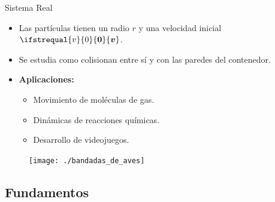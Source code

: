 \documentclass{beamer}
\renewcommand\vec[1]{\ifstrequal{#1}{0}{\ensuremath{\mathbf{0}}}{\ensuremath{\boldsymbol{#1}}}}
\begin{document}
            \begin{frame}{Sistema Real}
                \begin{itemize}
                    \item Las partículas tienen un radio $r$ y una velocidad inicial $\vec{v}$.
                    \item Se estudia como colisionan entre sí y con las paredes del contenedor.
                \end{itemize}
                \begin{minipage}[t]{0.5\textwidth}
                    \begin{itemize}
                        \item \textbf{Aplicaciones:}
                        \begin{itemize}
                            \item Movimiento de moléculas de gas.
                            \item Dinámicas de reacciones químicas.
                            \item Desarrollo de videojuegos.
                        \end{itemize}
                    \end{itemize}
                \end{minipage}
                \hfill
                \begin{minipage}[t]{0.45\textwidth}
                    \begin{figure}[H]
                        \centering
                        \texttt{[image: ./bandadas\_de\_aves]}
                        \label{fig:bandadas_de_aves}
                    \end{figure}
                \end{minipage}
            \end{frame}

        \subsection{Fundamentos}
\end{document}
